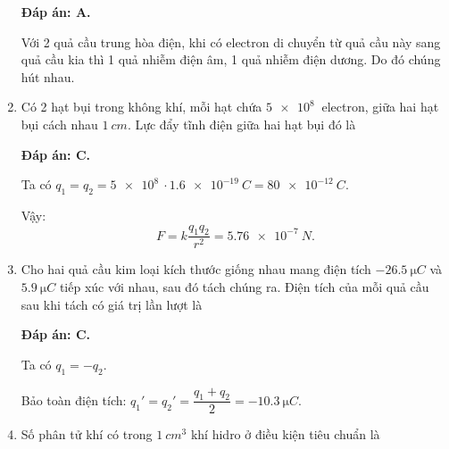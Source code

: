 \begin{enumerate}[label=\bfseries Câu \arabic*:]
{	}
	\loigiai
	{	\textbf{Đáp án: A.}
		
		Với 2 quả cầu trung hòa điện, khi có electron di chuyển từ quả cầu này sang quả cầu kia thì 1 quả nhiễm điện âm, 1 quả nhiễm điện dương. Do đó chúng hút nhau.
	}
	\item {}
	
	\cauhoi
	{Có 2 hạt bụi trong không khí, mỗi hạt chứa $\SI{5e8}{}$ electron, giữa hai hạt bụi cách nhau $\SI{1}{cm}$. Lực đẩy tĩnh điện giữa hai hạt bụi đó là
		
	}
	\loigiai
	{	\textbf{Đáp án: C.}
		
		Ta có $q_1=q_2=\SI{5e8}{} \cdot \SI{1.6e-19}{C} = \SI{80e-12}{C}$.
		
		Vậy:
		$$F=k\dfrac{q_1q_2}{r^2} = \SI{5.76e-7}{N}.$$
	}
	\item {}
	
	\cauhoi
	{Cho hai quả cầu kim loại kích thước giống nhau mang điện tích $\SI{-26.5}{\micro C}$ và $\SI{5.9}{\micro C}$ tiếp xúc với nhau, sau đó tách chúng ra. Điện tích của mỗi quả cầu sau khi tách có giá trị lần lượt là
		
	}
	\loigiai
	{	\textbf{Đáp án: C.}
		
		Ta có $q_1=-q_2$.
		
		Bảo toàn điện tích: $q_1' = q_2' = \dfrac{q_1+q_2}{2} = \SI{-10.3}{\micro C}$.
	}
	\item {}
	
	\cauhoi
	{Số phân tử khí có trong $\SI{1}{cm^3}$ khí hidro ở điều kiện tiêu chuẩn là
		
}
\end{enumerate}
